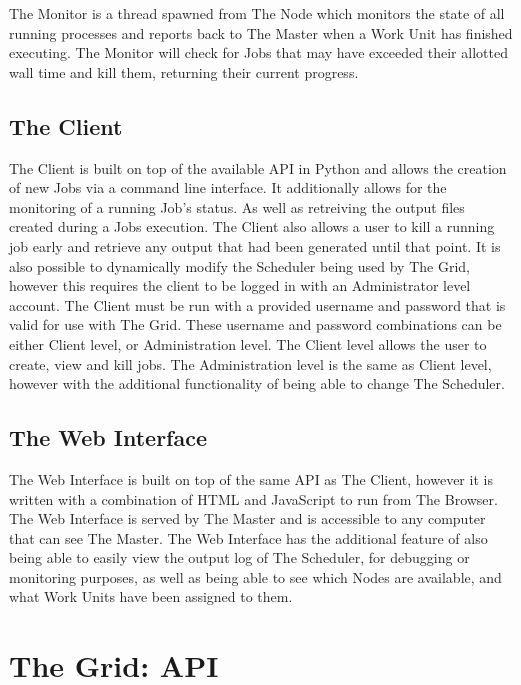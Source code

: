 The Monitor is a thread spawned from The Node which monitors the state of all running processes and reports back to The Master when a Work Unit has finished executing. The Monitor will check for Jobs that may have exceeded their allotted wall time and kill them, returning their current progress. 

\section{The Client}
\label{theclient}

The Client is built on top of the available API in Python and allows the creation of new Jobs via a command line interface. It additionally allows for the monitoring of a running Job's status. As well as retreiving the output files created during a Jobs execution. The Client also allows a user to kill a running job early and retrieve any output that had been generated until that point. It is also possible to dynamically modify the Scheduler being used by The Grid, however this requires the client to be logged in with an Administrator level account. The Client must be run with a provided username and password that is valid for use with The Grid. These username and password combinations can be either Client level, or Administration level. The Client level allows the user to create, view and kill jobs. The Administration level is the same as Client level, however with the additional functionality of being able to change The Scheduler.

\section{The Web Interface}
\label{thewebinterface}

The Web Interface is built on top of the same API as The Client, however it is written with a combination of HTML and JavaScript to run from The Browser. The Web Interface is served by The Master and is accessible to any computer that can see The Master. The Web Interface has the additional feature of also being able to easily view the output log of The Scheduler, for debugging or monitoring purposes, as well as being able to see which Nodes are available, and what Work Units have been assigned to them. 

\chapter{The Grid: API}
\label{thegrid:api}

